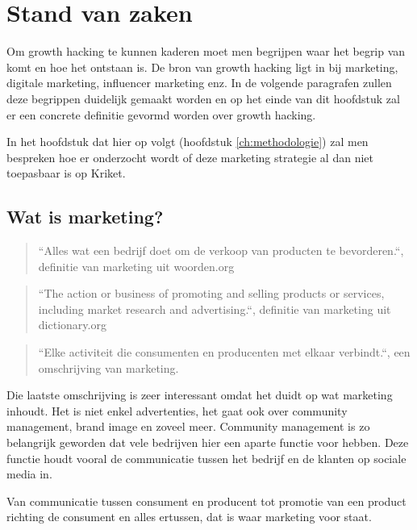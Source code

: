 \chapter{Stand van zaken} \label{ch:stand-van-zaken}


Om growth hacking te kunnen kaderen moet men begrijpen waar het begrip van komt en hoe het ontstaan is. De bron van growth hacking ligt in bij marketing, digitale marketing, influencer marketing enz. In de volgende paragrafen zullen deze begrippen duidelijk gemaakt worden en op het einde van dit hoofdstuk zal er een concrete definitie gevormd worden over growth hacking.

In het hoofdstuk dat hier op volgt (hoofdstuk \ref{ch:methodologie}) zal men bespreken hoe er onderzocht wordt of deze marketing strategie al dan niet toepasbaar is op Kriket.

\section{Wat is marketing?} \label{sec:marketing}
\begin{quote}
	``Alles wat een bedrijf doet om de verkoop van producten te bevorderen.``, definitie van marketing uit woorden.org
\end{quote}
\begin{quote}
	``The action or business of promoting and selling products or services, including market research and advertising.``, definitie van marketing uit dictionary.org
\end{quote}
\begin{quote}
``Elke activiteit die consumenten en producenten met elkaar verbindt.``, een omschrijving van marketing.
\end{quote}

Die laatste omschrijving is zeer interessant omdat het duidt op wat marketing inhoudt. Het is niet enkel advertenties, het gaat ook over community management, brand image en zoveel meer. Community management is zo belangrijk geworden dat vele bedrijven hier een aparte functie voor hebben. Deze functie houdt vooral de communicatie tussen het bedrijf en de klanten op sociale media in. 

Van communicatie tussen consument en producent tot promotie van een product richting de consument en alles ertussen, dat is waar marketing voor staat.

